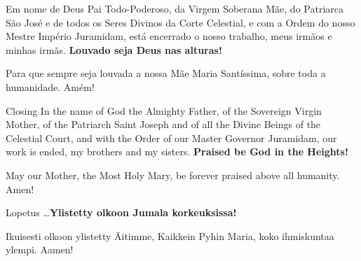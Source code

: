   \begin{passage}[PT]{}\vspace{-1ex}%
    Em nome de Deus Pai Todo-Poderoso, da Virgem
    Soberana Mãe, do Patriarca São José e de todos
    os Seres Divinos da Corte Celestial, e com
    a Ordem do nosso Mestre Império Juramidam,
    está encerrado o nosso trabalho, meus irmãos
    e minhas irmãs.
    \textbf{Louvado seja Deus nas alturas!}
    \par
    Para que sempre seja louvada a nossa Mãe Maria
    Santíssima, sobre toda a humanidade. Amém!
  \end{passage}
  \begin{passage}[EN]{Closing}
    In the name of God the Almighty Father, of the Sovereign
    Virgin Mother, of the Patriarch Saint Joseph and of all
    the Divine Beings of the Celestial Court, and with
    the Order of our Master Governor Juramidam,
    our work is ended, my brothers and my sisters.
    \textbf{Praised be God in the Heights!}
    \par
    May our Mother, the Most Holy Mary, be forever
    praised above all humanity. Amen!
  \end{passage}
  \begin{passage}[FI]{Lopetus}
    \ldots\textbf{Ylistetty olkoon Jumala korkeuksissa!}
    \par
    Ikuisesti olkoon ylistetty Äitimme, Kaikkein Pyhin Maria,
    koko ihmiskuntaa ylempi. Aamen!
  \end{passage}
\endsong


